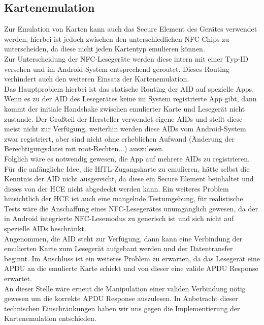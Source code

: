 \documentclass[a4paper,ngerman,12pt]{scrreprt}
\newcommand{\+}{\discretionary{\mbox{\scriptsize$\hookleftarrow$}}{}{}}
\begin{document}
\subsection*{Kartenemulation}

Zur Emulation von Karten kann auch das Secure Element des Gerätes verwendet werden, hierbei ist jedoch zwischen den unterschiedlichen N\+F\+C-\/\+Chips zu unterscheiden, da diese nicht jeden Kartentyp emulieren können.\\
\+Zur Unterscheidung der N\+F\+C-\/\+Lesegeräte werden diese intern mit einer Typ-\/\+ID versehen und im Android-\/\+System entsprechend geroutet. Dieses Routing verhindert auch den weiteren Einsatz der Kartenemulation.\\ Das Hauptproblem hierbei ist das statische Routing der \ac{AID} auf spezielle Apps. 
Wenn es zu der A\+ID des Lesegerätes keine im System registrierte App gibt, dann kommt der initiale Handshake zwischen emulierter Karte und Lesegerät nicht zustande. 
Der Großteil der Hersteller verwendet eigene A\+I\+Ds und stellt diese meist nicht zur Verfügung, weiterhin werden diese A\+I\+Ds vom Android-\/\+System zwar registriert, aber sind nicht ohne erheblichen Aufwand (Änderung der Berechtigungsdatei mit root-\/\+Rechten...) auszulesen. \\
Folglich wäre es notwendig gewesen, die App auf mehrere A\+I\+Ds zu registrieren. Für die anfängliche Idee, die Hf\+T\+L-\/\+Zugangskarte zu emulieren, hätte selbst die Kenntnis der A\+ID nicht ausgereicht, da diese ein Secure Element beinhaltet und dieses von der \ac{HCE} nicht abgedeckt werden kann. \newpage
Ein weiteres Problem hinsichtlich der \ac{HCE} ist auch eine mangelnde Testumgebung, für realistische Tests wäre die Anschaffung eines N\+F\+C-\/\+Lesegerätes unumgänglich gewesen, da der in Android integrierte N\+F\+C-\/\+Lesemodus zu generisch ist und sich nicht auf spezielle A\+I\+Ds beschränkt. \\
Angenommen, die A\+ID steht zur Verfügung, dann kann eine Verbindung der emulierten Karte zum Lesegerät aufgebaut werden und der Datentransfer beginnt. 
Im Anschluss ist ein weiteres Problem zu erwarten, da das Lesegerät eine \ac{APDU} an die emulierte Karte schickt und von dieser eine valide APDU Response erwartet. \\
An dieser Stelle wäre erneut die Manipulation einer validen Verbindung nötig gewesen um die korrekte APDU Response auszulesen. In Anbetracht dieser technischen Einschränkungen haben wir uns gegen die Implementierung der Kartenemulation entschieden.
\end{document}
